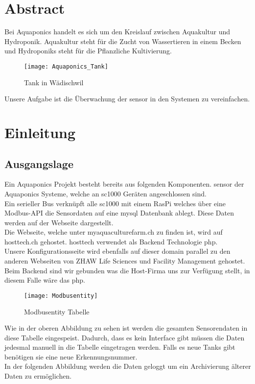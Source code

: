 \documentclass[../main.tex]{subfiles}
\begin{document}
	\section{Abstract}
	Bei Aquaponics handelt es sich um den Kreislauf zwischen Aquakultur und Hydroponik. Aquakultur steht für die Zucht von Wassertieren in einem Becken und Hydroponiks steht für die Pflanzliche Kultivierung. \\
	
	
	\begin{figure}[H]
		\centering
		\texttt{[image: Aquaponics\_Tank]}
		\caption{Tank in Wädischwil}
		\label{fig:Aquaponics_Tank}
	\end{figure}
	\par \noindent
	Unsere Aufgabe ist die Überwachung der \gls{sensor} in den Systemen zu vereinfachen. \\
	
	\section{Einleitung}
	
	\subsection{Ausgangslage}
	Ein Aquaponics Projekt besteht bereits aus folgenden Komponenten. \gls{sensor} der Aquaponics Systeme, welche an \gls{sc1000} Geräten angeschlossen sind. \\
	Ein serieller Bus verknüpft alle \gls{sc1000} mit einem RasPi welches über eine Modbus-API die Sensordaten auf eine \gls{mysql} Datenbank ablegt. Diese Daten werden auf der Webseite dargestellt. \\
	Die Webseite, welche unter myaquaculturefarm.ch zu finden ist, wird auf hosttech.ch gehostet. \gls{hosttech} verwendet als Backend Technologie \gls{php}.\\
	Unsere Konfigurationsseite wird ebenfalls auf dieser \gls{domain} parallel zu den anderen Webseiten von ZHAW Life Sciences und Facility Management gehostet. \\
	Beim Backend sind wir gebunden was die Host-Firma uns zur Verfügung stellt, in diesem Falle wäre das \gls{php}.
	
	\begin{figure}[H]
		\centering
		\texttt{[image: Modbusentity]}
		\caption{Modbusentity Tabelle}
		\label{fig:Modbusentity}
	\end{figure}
	\par \noindent
	Wie in der oberen Abbildung zu sehen ist werden die gesamten Sensorendaten in diese Tabelle eingespeist. Dadurch, dass es kein Interface gibt müssen die Daten jedesmal manuell in die Tabelle eingetragen werden. Falls es neue Tanks gibt benötigen sie eine neue Erkennungsnummer.  \\
	In der folgenden Abbildung werden die Daten geloggt um ein Archivierung älterer Daten zu ermöglichen.
	
\end{document}
